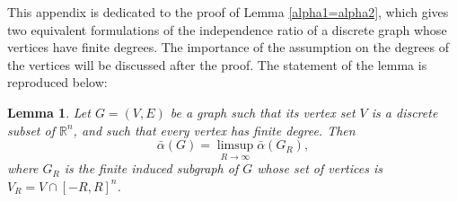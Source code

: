 \documentclass{amsart}                     %
\newtheorem{lemm}{Lemma}
\newcommand{\R}{{\mathbb R}}
\begin{document}
This appendix is dedicated to the proof of Lemma \ref{alpha1=alpha2}, which gives two equivalent formulations of the independence ratio 
of a discrete graph whose vertices have finite degrees. The importance of the assumption on the degrees of the vertices will be discussed after the proof. The statement of the lemma  is reproduced below:

\setcounter{lemm}{0}

\begin{lemm}
Let $G=(V,E)$ be a graph such that its vertex set $V$ is a discrete subset of $\R^n$, and such that every vertex  has finite degree. Then
$$ \bar{\alpha}(G)=\limsup_{R\to \infty} \bar{\alpha}(G_R),$$
where $G_R$ is the finite induced subgraph of $G$ whose set of vertices is $V_R=V\cap [-R,R]^n$.
\end{lemm}


\setcounter{lemm}{16}
\end{document}
